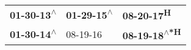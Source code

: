 \begin{supertabular}{lll}
 \textbf{01-30-13\textsuperscript{$\wedge$}} &  \textbf{01-29-15\textsuperscript{$\wedge$}} &           \textbf{08-20-17\textsuperscript{H}} \\
 \textbf{01-30-14\textsuperscript{$\wedge$}} &                   08-19-16\textsuperscript{} &  \textbf{08-19-18\textsuperscript{$\wedge$*H}} \\
\end{supertabular}

